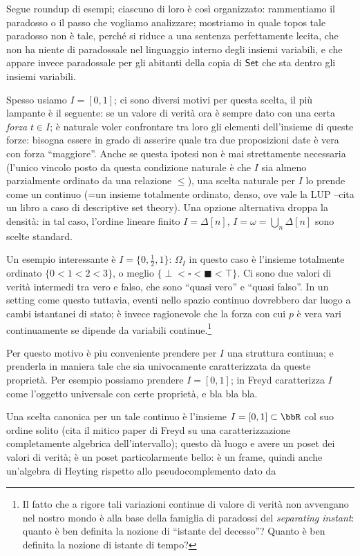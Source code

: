 \documentclass{amsart}
\begin{document}
Segue roundup di esempi; ciascuno di loro è così organizzato: rammentiamo il paradosso o il passo che vogliamo analizzare; mostriamo in quale topos tale paradosso non è tale, perché si riduce a una sentenza perfettamente lecita, che non ha niente di paradossale nel linguaggio interno degli insiemi variabili, e che appare invece paradossale per gli abitanti della copia di $\mathsf{Set}$ che sta dentro gli insiemi variabili.

Spesso usiamo $I=[0,1]$; ci sono diversi motivi per questa scelta, il più lampante è il seguente: se un valore di verità ora è sempre dato con una certa \emph{forza} $t\in I$; è naturale voler confrontare tra loro gli elementi dell'insieme di queste forze: bisogna essere in grado di asserire quale tra due proposizioni date è vera con forza ``maggiore''. Anche se questa ipotesi non è mai strettamente necessaria (l'unico vincolo posto da questa condizione naturale è che $I$ sia almeno parzialmente ordinato da una relazione $\le$), una scelta naturale per $I$ lo prende come un continuo (=un insieme totalmente ordinato, denso, ove vale la LUP --cita un libro a caso di descriptive set theory). Una opzione alternativa droppa la densità: in tal caso, l'ordine lineare finito $I=\Delta[n]$, $I=\omega = \bigcup_n \Delta[n]$ sono scelte standard.
\begin{remark}
  Un esempio interessante è $I=\{0,\frac{1}{2}, 1\}$: $\Omega_I$ in questo caso è l'insieme totalmente ordinato $\{0<1<2<3\}$, o meglio $\{\perp <  \square < \blacksquare < \top\}$. Ci sono due valori di verità intermedi tra vero e falso, che sono ``quasi vero'' e ``quasi falso''. In un setting come questo tuttavia, eventi nello spazio continuo dovrebbero dar luogo a cambi istantanei di stato; è invece ragionevole che la forza con cui $p$ è vera vari continuamente se dipende da variabili continue.\footnote{Il fatto che a rigore tali variazioni continue di valore di verità non avvengano nel nostro mondo è alla base della famiglia di paradossi del \emph{separating instant}: quanto è ben definita la nozione di ``istante del decesso''? Quanto è ben definita la nozione di istante di tempo?}

  Per questo motivo è piu conveniente prendere per $I$ una struttura continua; e prenderla in maniera tale che sia univocamente caratterizzata da queste proprietà. Per esempio possiamo prendere $I=[0,1]$; in \cite{} Freyd caratterizza $I$ come l'oggetto universale con certe proprietà, e bla bla bla.
\end{remark}
Una scelta canonica per un tale continuo è l'insieme $I=[0,1] \subset \bbR$ col suo ordine solito (cita il mitico paper di Freyd su una caratterizzazione completamente algebrica dell'intervallo); questo dà luogo e avere un poset dei valori di verità; è un poset particolarmente bello: è un frame, quindi anche un'algebra di Heyting rispetto allo pseudocomplemento dato da \todo{\dots}
\end{document}
